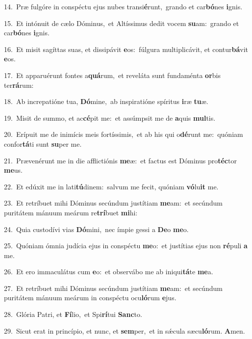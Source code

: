 {\numbfont\textcolor{\numbcolor}{14.}}~Præ fulgóre in conspéctu ejus nubes transi\-\textbf{é}\-runt,~\star grando et car\-\textbf{bó}\-nes \textbf{i}\-gnis.\par
{\numbfont\textcolor{\numbcolor}{15.}}~Et intónuit de cælo Dóminus,~\dagger et Altíssimus dedit vocem \textbf{su}\-am:~\star grando et car\-\textbf{bó}\-nes \textbf{i}\-gnis.\par
{\numbfont\textcolor{\numbcolor}{16.}}~Et misit sagíttas suas, et dissipávit \textbf{e}\-os:~\star fúlgura multiplicávit, et contur\-\textbf{bá}\-vit \textbf{e}\-os.\par
{\numbfont\textcolor{\numbcolor}{17.}}~Et apparuérunt fontes a\-\textbf{quá}\-rum,~\star et reveláta sunt fundaménta \textbf{or}\-bis ter\-\textbf{rá}\-rum:\par
{\numbfont\textcolor{\numbcolor}{18.}}~Ab increpatióne tua, \textbf{Dó}\-mine,~\star ab inspiratióne spíritus \textbf{i}\-ræ \textbf{tu}\-æ.\par
{\numbfont\textcolor{\numbcolor}{19.}}~Misit de summo, et ac\-\textbf{cé}\-pit me:~\star et assúmpsit me de \textbf{a}\-quis \textbf{mul}\-tis.\par
{\numbfont\textcolor{\numbcolor}{20.}}~Erípuit me de inimícis meis fortíssimis,~\dagger et ab his qui o\-\textbf{dé}\-runt me:~\star quóniam confor\-\textbf{tá}\-ti sunt \textbf{su}\-per me.\par
{\numbfont\textcolor{\numbcolor}{21.}}~Prævenérunt me in die afflictiónis \textbf{me}\-æ:~\star et factus est Dóminus pro\-\textbf{téc}\-tor \textbf{me}\-us.\par
{\numbfont\textcolor{\numbcolor}{22.}}~Et edúxit me in lati\-\textbf{tú}\-dinem:~\star salvum me fecit, quóniam \textbf{vó}\-lu\textbf{it} me.\par
{\numbfont\textcolor{\numbcolor}{23.}}~Et retríbuet mihi Dóminus secúndum justítiam \textbf{me}\-am:~\star et secúndum puritátem mánuum meárum re\-\textbf{trí}\-buet \textbf{mi}\-hi:\par
{\numbfont\textcolor{\numbcolor}{24.}}~Quia custodívi vias \textbf{Dó}\-mini,~\star nec ímpie gessi a \textbf{De}\-o \textbf{me}\-o.\par
{\numbfont\textcolor{\numbcolor}{25.}}~Quóniam ómnia judícia ejus in conspéctu \textbf{me}\-o:~\star et justítias ejus non \textbf{ré}\-puli \textbf{a} me.\par
{\numbfont\textcolor{\numbcolor}{26.}}~Et ero immaculátus cum \textbf{e}\-o:~\star et observábo me ab iniqui\-\textbf{tá}\-te \textbf{me}\-a.\par
{\numbfont\textcolor{\numbcolor}{27.}}~Et retríbuet mihi Dóminus secúndum justítiam \textbf{me}\-am:~\star et secúndum puritátem mánuum meárum in conspéctu ocu\-\textbf{ló}\-rum \textbf{e}\-jus.\par
{\numbfont\textcolor{\numbcolor}{28.}}~Glória Patri, et \textbf{Fí}\-lio,~\star et Spi\-\textbf{rí}\-tui \textbf{Sanc}\-to.\par
{\numbfont\textcolor{\numbcolor}{29.}}~Sicut erat in princípio, et nunc, et \textbf{sem}\-per,~\star et in sǽcula sæcu\-\textbf{ló}\-rum. \textbf{A}\-men.\par
